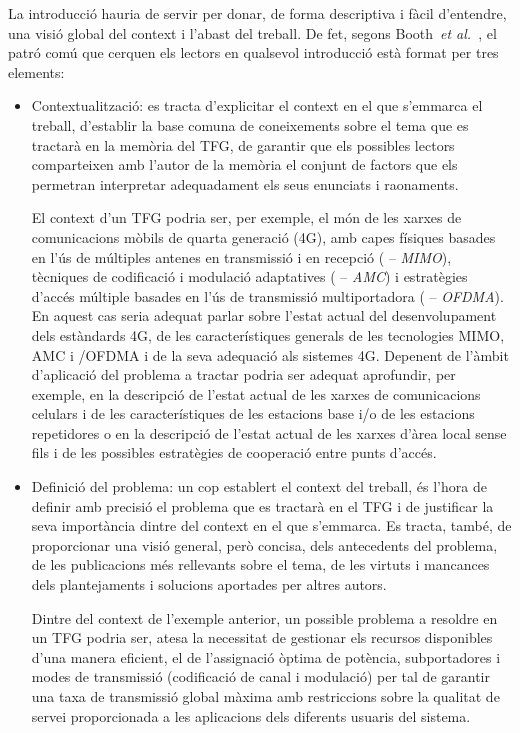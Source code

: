 La introducció hauria de servir per donar, de forma descriptiva i fàcil d'entendre, una visió global del context i l'abast del treball. De fet, segons Booth~\emph{et al.}~\cite{Booth08}, el patró comú que cerquen els lectors en qualsevol introducció està format per tres elements:
\begin{itemize}
   \item Contextualització: es tracta d'explicitar el context en el que s'emmarca el treball, d'establir la base comuna de coneixements sobre el tema que es tractarà en la memòria del \ac{TFG}, de garantir que els possibles lectors comparteixen amb l'autor de la memòria el conjunt de factors que els permetran interpretar adequadament els seus enunciats i raonaments.

       El context d'un \ac{TFG} podria ser, per exemple, el món de les xarxes de comunicacions mòbils de quarta generació (4G), amb capes físiques basades en l'ús de múltiples antenes en transmissió i en recepció ( -- \emph{\acl{MIMO}}), tècniques de codificació i modulació adaptatives ( -- \emph{\acl{AMC}}) i estratègies d'accés múltiple basades en l'ús de transmissió multiportadora ( -- \emph{\acl{OFDMA}}). En aquest cas seria adequat parlar sobre l'estat actual del desenvolupament dels estàndards 4G, de les característiques generals de les tecnologies \ac{MIMO}, \ac{AMC} i /\ac{OFDMA} i de la seva adequació als sistemes 4G. Depenent de l'àmbit d'aplicació del problema a tractar podria ser adequat aprofundir, per exemple, en la descripció de l'estat actual de les xarxes de comunicacions ce\lgem{}lulars i de les característiques de les estacions base i/o de les estacions repetidores o en la descripció de l'estat actual de les xarxes d'àrea local sense fils i de les possibles estratègies de cooperació entre punts d'accés.

   \item Definició del problema: un cop establert el context del treball, és l'hora de definir amb precisió el problema que es tractarà en el \ac{TFG} i de justificar la seva importància dintre del context en el que s'emmarca. Es tracta, també, de proporcionar una visió general, però concisa, dels antecedents del problema, de les publicacions més rellevants sobre el tema, de les virtuts i mancances dels plantejaments i solucions aportades per altres autors.

       Dintre del context de l'exemple anterior, un possible problema a resoldre en un \ac{TFG} podria ser, atesa la necessitat de gestionar els recursos disponibles d'una manera eficient, el de l'assignació òptima de potència, subportadores i modes de transmissió (codificació de canal i modulació) per tal de garantir una taxa de transmissió global màxima amb restriccions sobre la qualitat de servei proporcionada a les aplicacions dels diferents usuaris del sistema.


\end{itemize}
